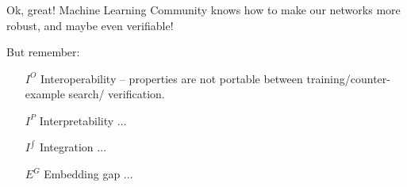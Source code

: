 \documentclass[aspectratio=169]{beamer}
\begin{document}
\begin{frame}
\frametitle{}

\begin{alertblock}{Ok, great!}
 Machine Learning Community knows how to make our networks more robust, and maybe even verifiable!
\end{alertblock}
\pause
But remember: 

\begin{block}{}
\begin{itemize}
\item[$I^O$] \alert{Interoperability -- properties are not portable between training/counter-example search/ verification.}

\item[$I^{P}$] \alert{Interpretability} $\ldots$

\item[$I^{\int}$] Integration $\ldots$

\item[$E^G$] Embedding gap $\ldots$
\end{itemize}
\end{block}
\end{frame}
\end{document}
